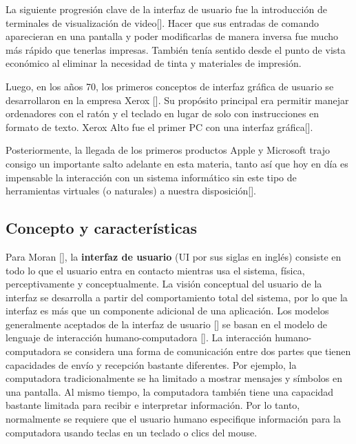 La siguiente progresión clave de la interfaz de usuario fue la introducción de terminales de visualización de video[\cite{7}]. Hacer que sus entradas de comando aparecieran en una pantalla y poder modificarlas de manera inversa fue mucho más rápido que tenerlas impresas. También tenía sentido desde el punto de vista económico al eliminar la necesidad de tinta y materiales de impresión.


Luego, en los años 70, los primeros conceptos de interfaz gráfica de usuario se desarrollaron en la empresa Xerox [\cite{5,8}]. Su propósito principal era permitir manejar ordenadores con el ratón y el teclado en lugar de solo con instrucciones en formato de texto. Xerox Alto fue el primer PC con una interfaz gráfica[\cite{7}].

Posteriormente, la llegada de los primeros productos Apple y Microsoft trajo consigo un importante salto adelante en esta materia, tanto así que hoy en día es impensable la interacción con un sistema informático sin este tipo de herramientas virtuales (o naturales) a nuestra disposición[\cite{7,5}].

\subsection{Concepto y características}

Para Moran [\cite{23}], la \textbf{interfaz de usuario} (UI por sus siglas en inglés) consiste en todo lo que el usuario entra en contacto mientras usa el sistema, física, perceptivamente y conceptualmente. La visión conceptual del usuario de la interfaz se desarrolla a partir del comportamiento total del sistema, por lo que la interfaz es más que un componente adicional de una aplicación. Los modelos generalmente aceptados de la interfaz de usuario [\cite{24, 25, 26}] se basan en el modelo de lenguaje de interacción humano-computadora [\cite{28}]. La interacción humano-computadora se considera una forma de comunicación entre dos partes que tienen capacidades de envío y recepción bastante diferentes. Por ejemplo, la computadora tradicionalmente se ha limitado a mostrar mensajes y símbolos en una pantalla. Al mismo tiempo, la computadora también tiene una capacidad bastante limitada para recibir e interpretar información. Por lo tanto, normalmente se requiere que el usuario humano especifique información para la computadora usando teclas en un teclado o clics del mouse.

